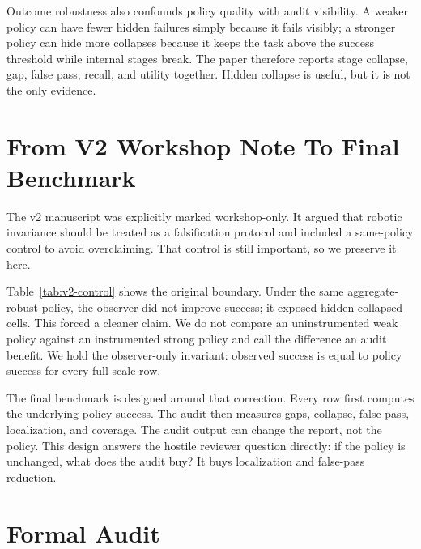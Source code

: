 \documentclass{article}
\begin{document}
Outcome robustness also confounds policy quality with audit visibility. A weaker policy can have fewer hidden failures simply because it fails visibly; a stronger policy can hide more collapses because it keeps the task above the success threshold while internal stages break. The paper therefore reports stage collapse, gap, false pass, recall, and utility together. Hidden collapse is useful, but it is not the only evidence.

\section{From V2 Workshop Note To Final Benchmark}

The v2 manuscript was explicitly marked workshop-only. It argued that robotic invariance should be treated as a falsification protocol and included a same-policy control to avoid overclaiming. That control is still important, so we preserve it here.

\begin{table}[t]
\centering
\small
\resizebox{\linewidth}{!}{}
\caption{V2 same-policy measurement control. The observer exposes collapsed transform-stage cells while leaving policy success unchanged. This table motivates the final full-scale benchmark but is not the main evidence.}
\label{tab:v2-control}
\end{table}

Table~\ref{tab:v2-control} shows the original boundary. Under the same aggregate-robust policy, the observer did not improve success; it exposed hidden collapsed cells. This forced a cleaner claim. We do not compare an uninstrumented weak policy against an instrumented strong policy and call the difference an audit benefit. We hold the observer-only invariant: observed success is equal to policy success for every full-scale row.

The final benchmark is designed around that correction. Every row first computes the underlying policy success. The audit then measures gaps, collapse, false pass, localization, and coverage. The audit output can change the report, not the policy. This design answers the hostile reviewer question directly: if the policy is unchanged, what does the audit buy? It buys localization and false-pass reduction.

\section{Formal Audit}
\end{document}
